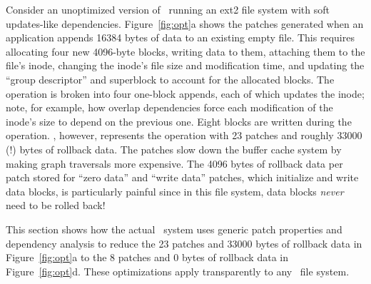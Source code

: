 Consider an unoptimized version of \Kudos\ running an ext2 file system with
soft updates-like dependencies.
%
Figure~\ref{fig:opt}a shows the patches generated when an application appends
16384 bytes of data to an existing empty file.
%
This requires allocating four new 4096-byte blocks, writing data to them,
attaching them to the file's inode, changing the inode's file size and
modification time, and updating the ``group descriptor'' and superblock to
account for the allocated blocks.
%
The operation is broken into four one-block appends, each of which updates
the inode; note, for example, how overlap dependencies force each
modification of the inode's size to depend on the previous one.
%
Eight blocks are written during the operation.
%
\Kudos, however, represents the operation with 23 patches and roughly 33000
(!) bytes of rollback data.
%
The patches slow down the buffer cache system by making graph traversals
more expensive.
%
The 4096 bytes of rollback data per patch stored for ``zero data'' and
``write data'' patches, which initialize and write data blocks, is
particularly painful since in this file system, data blocks \emph{never}
need to be rolled back!


This section shows how the actual \Kudos\ system uses generic patch
properties and dependency analysis to reduce the 23 patches and 33000 bytes
of rollback data in Figure~\ref{fig:opt}a to the 8 patches and 0 bytes of
rollback data in Figure~\ref{fig:opt}d.
%
These optimizations apply transparently to any \Kudos\ file system.


